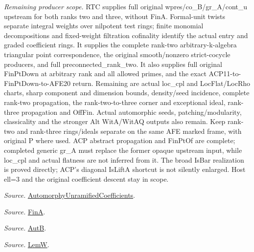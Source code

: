 \emph{Remaining producer scope.} RTC supplies full original wpres/co\_\allowbreak B/gr\_\allowbreak A/cont\_\allowbreak u upstream for both ranks two and three, without FinA. Formal-unit twists separate integral weights over nilpotent test rings; finite monomial decompositions and fixed-weight filtration cofinality identify the actual entry and graded coefficient rings. It supplies the complete rank-two arbitrary-k-algebra triangular point correspondence, the original smooth/nonzero strict-cocycle producers, and full preconnected\_\allowbreak rank\_\allowbreak two. It also supplies full original FinPtDown at arbitrary rank and all allowed primes, and the exact ACP11-to-FinPtDown-to-AFE20 return. Remaining are actual loc\_\allowbreak cpl and LocFlat/LocRho charts, sharp component and dimension bounds, density/seed incidence, complete rank-two propagation, the rank-two-to-three corner and exceptional ideal, rank-three propagation and OffFin. Actual automorphic seeds, patching/modularity, classicality and the stronger Alt WitA/WitAQ outputs also remain. Keep rank-two and rank-three rings/ideals separate on the same AFE marked frame, with original P where used. ACP abstract propagation and FinPtOf are complete; completed generic gr\_\allowbreak A must replace the former opaque upstream input, while loc\_\allowbreak cpl and actual flatness are not inferred from it. The broad IsBar realization is proved directly; ACP’s diagonal IsLiftA shortcut is not silently enlarged. Host ell=3 and the original coefficient descent stay in scope.

\emph{Source.} \href{https://github.com/CocoSgt/riemann-hypothesis-lean/blob/7cbf7a0c32fca1badf05931879a37c3f8a2b03b4/src/Development/AutomorphicArithmetic/AutomorphicVarieties/AutomorphicCases/AutomorphyUnramifiedCoefficients.lean#L24-L27}{AutomorphyUnramifiedCoefficients}.

\emph{Source.} \href{https://github.com/CocoSgt/riemann-hypothesis-lean/blob/7cbf7a0c32fca1badf05931879a37c3f8a2b03b4/src/Development/AutomorphicArithmetic/AutomorphicVarieties/AutomorphicCases/AutomorphyUnramifiedCoefficients.lean#L12-L13}{FinA}.

\emph{Source.} \href{https://github.com/CocoSgt/riemann-hypothesis-lean/blob/7cbf7a0c32fca1badf05931879a37c3f8a2b03b4/src/Development/AutomorphicArithmetic/AutomorphicVarieties/AutomorphicCases/AutomorphyUnramifiedCoefficients.lean#L15-L17}{AutB}.

\emph{Source.} \href{https://github.com/CocoSgt/riemann-hypothesis-lean/blob/7cbf7a0c32fca1badf05931879a37c3f8a2b03b4/src/Development/AutomorphicArithmetic/AutomorphicVarieties/AutomorphicCases/AutomorphyUnramifiedCoefficients.lean#L19-L22}{LemW}.



